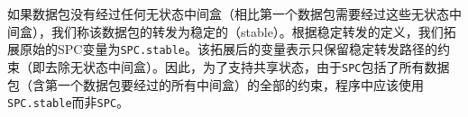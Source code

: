 \documentclass{ctexart}
\newcommand{\para}[1]{\noindent {\bf #1}}%
\newcommand{\codeword}[1]{\texttt{\small{#1}}}
\begin{document}
如果数据包没有经过任何无状态中间盒（相比第一个数据包需要经过这些无状态中间盒），我们称该数据包的转发为稳定的（stable）。根据稳定转发的定义，我们拓展原始的SPC变量为\codeword{SPC.stable}。该拓展后的变量表示只保留稳定转发路径的约束（即去除无状态中间盒）。因此，为了支持共享状态，由于\codeword{SPC}包括了所有数据包（含第一个数据包要经过的所有中间盒）的全部的约束，程序中应该使用\codeword{SPC.stable}而非\codeword{SPC}。

\end{document}
